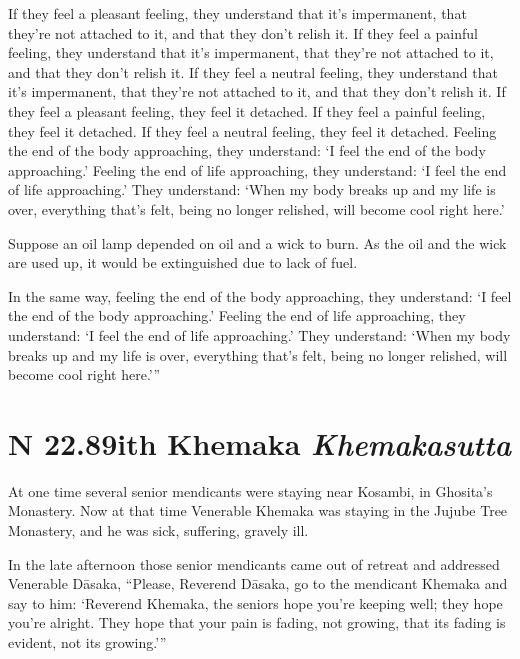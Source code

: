\documentclass[12pt,openany]{book}%
\newcommand*{\suttatitleacronym}[1]{\smaller[2]{#1}\vspace*{.3em}}
\newcommand*{\suttatitletranslation}[1]{\linebreak{#1}}
\newcommand*{\suttatitleroot}[1]{\linebreak\smaller[2]\itshape{#1}}
\newcommand*{\tocacronym}[1]{\hspace*{-3.3em}{#1}\quad}
\newcommand*{\toctranslation}[1]{#1}
\newcommand*{\tocroot}[1]{(\textit{#1})}
\begin{document}
If they feel a pleasant feeling, they understand that it’s impermanent, that they’re not attached to it, and that they don’t relish it. If they feel a painful feeling, they understand that it’s impermanent, that they’re not attached to it, and that they don’t relish it. If they feel a neutral feeling, they understand that it’s impermanent, that they’re not attached to it, and that they don’t relish it. If they feel a pleasant feeling, they feel it detached. If they feel a painful feeling, they feel it detached. If they feel a neutral feeling, they feel it detached. Feeling the end of the body approaching, they understand: ‘I feel the end of the body approaching.’ Feeling the end of life approaching, they understand: ‘I feel the end of life approaching.’ They understand: ‘When my body breaks up and my life is over, everything that’s felt, being no longer relished, will become cool right here.’ 

Suppose an oil lamp depended on oil and a wick to burn. As the oil and the wick are used up, it would be extinguished due to lack of fuel. 

In the same way, feeling the end of the body approaching, they understand: ‘I feel the end of the body approaching.’ Feeling the end of life approaching, they understand: ‘I feel the end of life approaching.’ They understand: ‘When my body breaks up and my life is over, everything that’s felt, being no longer relished, will become cool right here.’” 

%
\section*{{\suttatitleacronym SN 22.89}{\suttatitletranslation With Khemaka }{\suttatitleroot Khemakasutta}}
\addcontentsline{toc}{section}{\tocacronym{SN 22.89} \toctranslation{With Khemaka } \tocroot{Khemakasutta}}

At one time several senior mendicants were staying near Kosambi, in Ghosita’s Monastery. Now at that time Venerable Khemaka was staying in the Jujube Tree Monastery, and he was sick, suffering, gravely ill. 

In the late afternoon those senior mendicants came out of retreat and addressed Venerable \textsanskrit{Dāsaka}, “Please, Reverend \textsanskrit{Dāsaka}, go to the mendicant Khemaka and say to him: ‘Reverend Khemaka, the seniors hope you’re keeping well; they hope you’re alright. They hope that your pain is fading, not growing, that its fading is evident, not its growing.’” 
\end{document}
